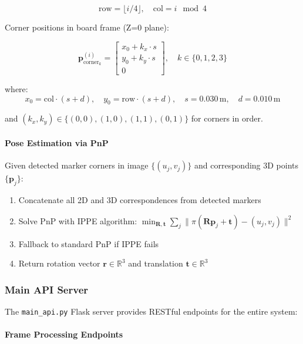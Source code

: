 \[
\text{row} = \lfloor i / 4 \rfloor, \quad \text{col} = i \mod 4
\]

Corner positions in board frame (Z=0 plane):

\[
\mathbf{p}_{\text{corner}_k}^{(i)} = \begin{bmatrix}
x_0 + k_x \cdot s \\
y_0 + k_y \cdot s \\
0
\end{bmatrix}, \quad k \in \{0, 1, 2, 3\}
\]

where:
\[
x_0 = \text{col} \cdot (s + d), \quad
y_0 = \text{row} \cdot (s + d), \quad
s = 0.030\,\text{m}, \quad
d = 0.010\,\text{m}
\]

and $(k_x, k_y) \in \{(0,0), (1,0), (1,1), (0,1)\}$ for corners in order.

\paragraph{Pose Estimation via PnP}

Given detected marker corners in image $\{(u_j, v_j)\}$ and corresponding 3D points $\{\mathbf{p}_j\}$:

\begin{enumerate}
    \item Concatenate all 2D and 3D correspondences from detected markers
    \item Solve PnP with IPPE algorithm: $\min_{\mathbf{R}, \mathbf{t}} \sum_j \| \pi(\mathbf{R}\mathbf{p}_j + \mathbf{t}) - (u_j, v_j) \|^2$
    \item Fallback to standard PnP if IPPE fails
    \item Return rotation vector $\mathbf{r} \in \mathbb{R}^3$ and translation $\mathbf{t} \in \mathbb{R}^3$
\end{enumerate}

\subsubsection{Main API Server}

The \texttt{main\_api.py} Flask server provides RESTful endpoints for the entire system:

\paragraph{Frame Processing Endpoints}

